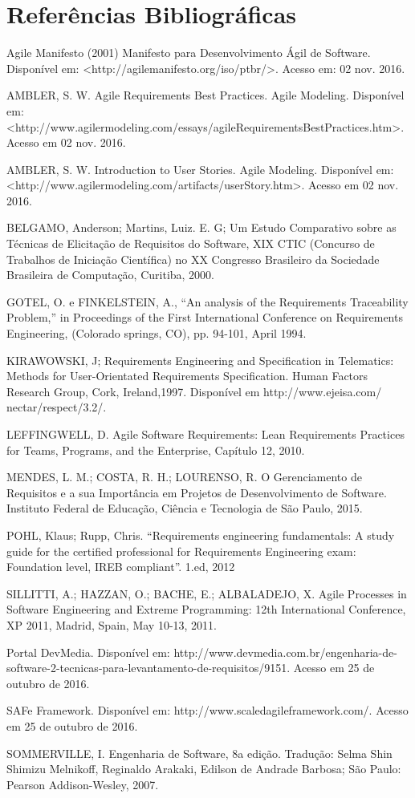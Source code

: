 \chapter[Referências Bibliográficas]{Referências Bibliográficas}

Agile Manifesto (2001) Manifesto para Desenvolvimento Ágil de Software. Disponível em: <http://agilemanifesto.org/iso/ptbr/>. Acesso em: 02 nov. 2016.

AMBLER, S. W. Agile Requirements Best Practices. Agile Modeling. Disponível em: <http://www.agilermodeling.com/essays/agileRequirementsBestPractices.htm>. Acesso em 02 nov. 2016.

AMBLER, S. W. Introduction to User Stories. Agile Modeling. Disponível em: <http://www.agilermodeling.com/artifacts/userStory.htm>. Acesso em 02 nov. 2016.

BELGAMO, Anderson; Martins, Luiz. E. G; Um Estudo Comparativo sobre as Técnicas de Elicitação de Requisitos do Software, XIX CTIC (Concurso de Trabalhos de Iniciação Científica) no XX Congresso Brasileiro da Sociedade Brasileira de Computação, Curitiba, 2000.

GOTEL, O. e FINKELSTEIN, A., “An analysis of the Requirements Traceability Problem,” in Proceedings of the First International Conference on Requirements Engineering, (Colorado springs, CO), pp. 94-101, April 1994.

KIRAWOWSKI, J; Requirements Engineering and Specification in Telematics: Methods for User-Orientated Requirements Specification. Human Factors Research Group, Cork, Ireland,1997. Disponível em http://www.ejeisa.com/ nectar/respect/3.2/.

LEFFINGWELL, D. Agile Software Requirements: Lean Requirements Practices for Teams, Programs, and the Enterprise, Capítulo 12, 2010.

MENDES, L. M.; COSTA, R. H.; LOURENSO, R. O Gerenciamento de Requisitos e a sua Importância em Projetos de Desenvolvimento de Software. Instituto Federal de Educação, Ciência e Tecnologia de São Paulo, 2015.

POHL, Klaus; Rupp, Chris. “Requirements engineering fundamentals: A study guide for the certified professional for Requirements Engineering exam: Foundation level, IREB compliant”. 1.ed, 2012

SILLITTI, A.; HAZZAN, O.; BACHE, E.; ALBALADEJO, X. Agile Processes in Software Engineering and Extreme Programming: 12th International Conference, XP 2011, Madrid, Spain, May 10-13, 2011.

Portal DevMedia. Disponível em: http://www.devmedia.com.br/engenharia-de-software-2-tecnicas-para-levantamento-de-requisitos/9151. Acesso em 25 de outubro de 2016.

SAFe Framework. Disponível em: http://www.scaledagileframework.com/. Acesso em 25 de outubro de 2016.

SOMMERVILLE, I. Engenharia de Software, 8a edição. Tradução: Selma Shin Shimizu Melnikoff, Reginaldo Arakaki, Edilson de Andrade Barbosa; São Paulo: Pearson Addison-Wesley, 2007.
